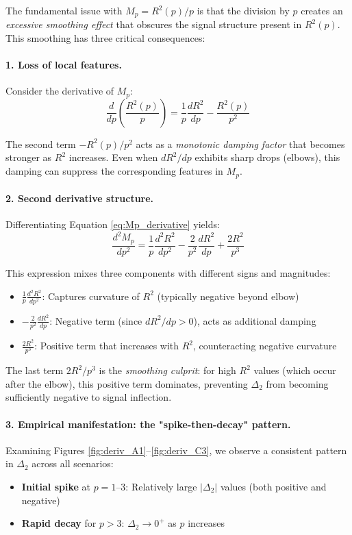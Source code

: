 \documentclass[11pt,a4paper]{article}
\begin{document}
The fundamental issue with $M_p = R^2(p)/p$ is that the division by $p$ creates an \emph{excessive smoothing effect} that obscures the signal structure present in $R^2(p)$. This smoothing has three critical consequences:

\paragraph{1. Loss of local features.}
Consider the derivative of $M_p$:
\begin{equation}
\frac{d}{dp}\left(\frac{R^2(p)}{p}\right) = \frac{1}{p}\frac{dR^2}{dp} - \frac{R^2(p)}{p^2}
\label{eq:Mp_derivative}
\end{equation}

The second term $-R^2(p)/p^2$ acts as a \emph{monotonic damping factor} that becomes stronger as $R^2$ increases. Even when $dR^2/dp$ exhibits sharp drops (elbows), this damping can suppress the corresponding features in $M_p$.

\paragraph{2. Second derivative structure.}
Differentiating Equation \eqref{eq:Mp_derivative} yields:
\begin{equation}
\frac{d^2M_p}{dp^2} = \frac{1}{p}\frac{d^2R^2}{dp^2} - \frac{2}{p^2}\frac{dR^2}{dp} + \frac{2R^2}{p^3}
\label{eq:Mp_second_deriv}
\end{equation}

This expression mixes three components with different signs and magnitudes:
\begin{itemize}
\item $\frac{1}{p}\frac{d^2R^2}{dp^2}$: Captures curvature of $R^2$ (typically negative beyond elbow)
\item $-\frac{2}{p^2}\frac{dR^2}{dp}$: Negative term (since $dR^2/dp > 0$), acts as additional damping
\item $\frac{2R^2}{p^3}$: Positive term that increases with $R^2$, counteracting negative curvature
\end{itemize}

The last term $2R^2/p^3$ is the \emph{smoothing culprit}: for high $R^2$ values (which occur after the elbow), this positive term dominates, preventing $\Delta_2$ from becoming sufficiently negative to signal inflection.

\paragraph{3. Empirical manifestation: the "spike-then-decay" pattern.}
Examining Figures \ref{fig:deriv_A1}--\ref{fig:deriv_C3}, we observe a consistent pattern in $\Delta_2$ across all scenarios:
\begin{itemize}
\item \textbf{Initial spike} at $p = 1$--3: Relatively large $|\Delta_2|$ values (both positive and negative)
\item \textbf{Rapid decay} for $p > 3$: $\Delta_2 \to 0^+$ as $p$ increases
\end{itemize}
\end{document}
